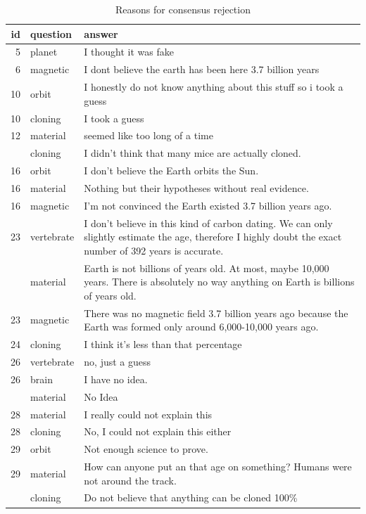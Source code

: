 \documentclass[
  doc,floatsintext]{apa6}
\begin{document}
\begin{longtable}[t]{>{}r>{}l>{\raggedright\arraybackslash}p{30em}}
\caption{\label{tab:exp4-reasons-rejection}Reasons for consensus rejection}\\
\toprule
id & question & answer\\
\midrule
5 & planet & I thought it was fake\\
6 & magnetic & I dont believe the earth has been here 3.7 billion years\\
10 & orbit & I honestly do not know anything about this stuff so i took a guess\\
10 & cloning & I took a guess\\
12 & material & seemed like too long of a time\\
\addlinespace
14 & cloning & I didn't think that many mice are actually cloned.\\
16 & orbit & I don't believe the Earth orbits the Sun.\\
16 & material & Nothing but their hypotheses without real evidence.\\
16 & magnetic & I'm not convinced the Earth existed 3.7 billion years ago.\\
23 & vertebrate & I don't believe in this kind of carbon dating. We can only slightly estimate the age, therefore I highly doubt the exact number of 392 years is accurate.\\
\addlinespace
23 & material & Earth is not billions of years old. At most, maybe 10,000 years. There is absolutely no way anything on Earth is billions of years old.\\
23 & magnetic & There was no magnetic field 3.7 billion years ago because the Earth was formed only around 6,000-10,000 years ago.\\
24 & cloning & I think it's less than that percentage\\
26 & vertebrate & no, just a guess\\
26 & brain & I have no idea.\\
\addlinespace
26 & material & No Idea\\
28 & material & I really could not explain this\\
28 & cloning & No, I could not explain this either\\
29 & orbit & Not enough science to prove.\\
29 & material & How can anyone put an  that age on something? Humans were not around the track.\\
\addlinespace
29 & cloning & Do not believe that anything can be cloned 100\%\\

\end{longtable}
\end{document}
